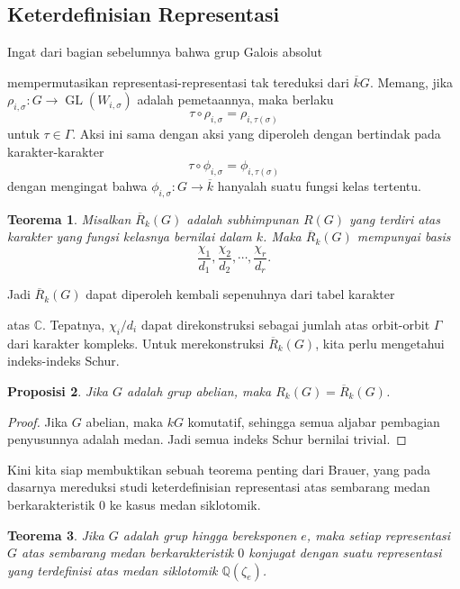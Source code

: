 \documentclass[12pt]{article}
\theoremstyle{plain}
\newtheorem{theorem}{Teorema}[section]
\newtheorem{proposition}[theorem]{Proposisi}
\theoremstyle{definition}
\theoremstyle{remark}
\numberwithin{equation}{section}
\begin{document}
\subsection{Keterdefinisian Representasi}

Ingat dari bagian sebelumnya bahwa grup Galois absolut

mempermutasikan representasi-representasi tak tereduksi dari $\overline{k}G$.
Memang, jika $\rho_{i,\sigma} : G \to \operatorname{GL}(W_{i,\sigma})$
adalah pemetaannya, maka berlaku
\[
\tau \circ \rho_{i,\sigma} = \rho_{i,\tau(\sigma)}
\]
untuk $\tau \in \Gamma$.
Aksi ini sama dengan aksi yang diperoleh dengan bertindak pada
karakter-karakter
\[
\tau \circ \phi_{i,\sigma} = \phi_{i,\tau(\sigma)}
\]
dengan mengingat bahwa $\phi_{i,\sigma}: G \to \overline{k}$ hanyalah suatu
fungsi kelas tertentu.
\begin{theorem}

Misalkan $\overline{R}_k(G)$ adalah subhimpunan $R(G)$ yang terdiri atas karakter
yang fungsi kelasnya bernilai dalam $k$.
Maka $\overline{R}_k(G)$ mempunyai basis
\[
\frac{\chi_1}{d_1},
\frac{\chi_2}{d_2},
\cdots,
\frac{\chi_r}{d_r}.
\]
\end{theorem}
Jadi $\overline{R}_k(G)$ dapat diperoleh kembali sepenuhnya dari tabel karakter

atas $\mathbb{C}$. Tepatnya, $\chi_i/d_i$ dapat direkonstruksi
sebagai jumlah atas orbit-orbit $\Gamma$ dari karakter kompleks.
Untuk merekonstruksi $\overline{R}_k(G)$,
kita perlu mengetahui indeks-indeks Schur.

\begin{proposition}
Jika $G$ adalah grup abelian,
maka $R_k(G) = \overline{R}_k(G)$.
\end{proposition}

\begin{proof}
Jika $G$ abelian, maka $kG$ komutatif, sehingga semua aljabar pembagian
penyusunnya adalah medan. Jadi semua indeks Schur bernilai trivial.
\end{proof}

Kini kita siap membuktikan sebuah teorema penting dari Brauer, yang
pada dasarnya mereduksi studi keterdefinisian representasi atas
sembarang medan berkarakteristik $0$ ke kasus medan siklotomik.

\begin{theorem} \label{thm:define_over_cyclotomic}
Jika $G$ adalah grup hingga bereksponen $e$,
maka setiap representasi $G$ atas sembarang medan
berkarakteristik $0$
konjugat dengan suatu representasi yang terdefinisi atas
medan siklotomik $\mathbb{Q}(\zeta_e)$.
\end{theorem}
\end{document}

